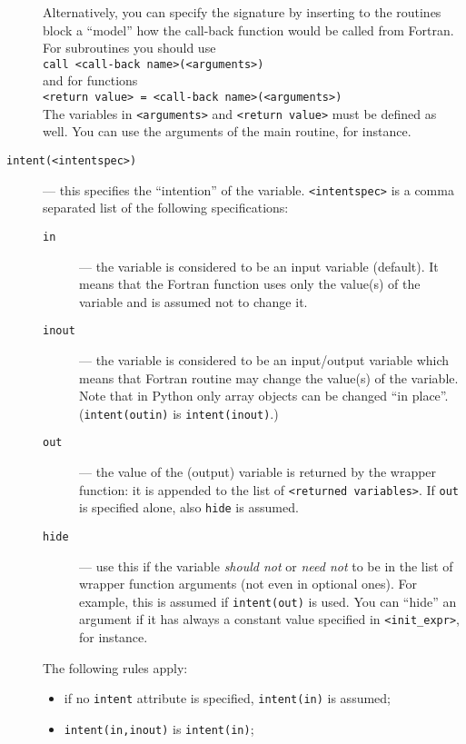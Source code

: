 \begin{description}
  Alternatively, you can specify the signature by inserting to the
  routines block a ``model'' how the call-back function would be called
  from Fortran. For subroutines you should use\\
  \hspace*{2em}\texttt{call <call-back name>(<arguments>)}\\
  and for functions\\%
  \hspace*{2em}\texttt{<return value> = <call-back name>(<arguments>)}\\
  The variables in \texttt{<arguments>} and \texttt{<return value>}
  must be defined as well. You can use the arguments of the main
  routine, for instance.
\item[\texttt{intent(<intentspec>)}] --- this specifies the
  ``intention'' of the variable. \texttt{<intentspec>} is a comma
  separated list of the following specifications:
  \begin{description}
  \item[\texttt{in}] --- the variable is considered to be an input
    variable (default). It means that the Fortran function uses only
    the value(s) of the variable and is assumed not to change it.
  \item[\texttt{inout}] --- the variable is considered to be an
    input/output variable which means that Fortran routine may change
    the value(s) of the variable. Note that in Python only array
    objects can be changed ``in place''. (\texttt{intent(outin)} is
    \texttt{intent(inout)}.)
  \item[\texttt{out}] --- the value of the (output) variable is
    returned by the wrapper function: it is appended to the list of
    \texttt{<returned variables>}. If \texttt{out} is specified alone,
    also \texttt{hide} is assumed.
  \item[\texttt{hide}] --- use this if the variable \emph{should not}
    or \emph{need not} to be in the list of wrapper function arguments
    (not even in optional ones). For example, this is assumed if
    \texttt{intent(out)} is used.  You can ``hide'' an argument if it
    has always a constant value specified in \texttt{<init\_expr>},
    for instance.
  \end{description}
  The following rules apply:
  \begin{itemize}
  \item if no \texttt{intent} attribute is specified, \texttt{intent(in)} is
  assumed;
  \item \texttt{intent(in,inout)} is \texttt{intent(in)};

\end{itemize}
\end{description}
